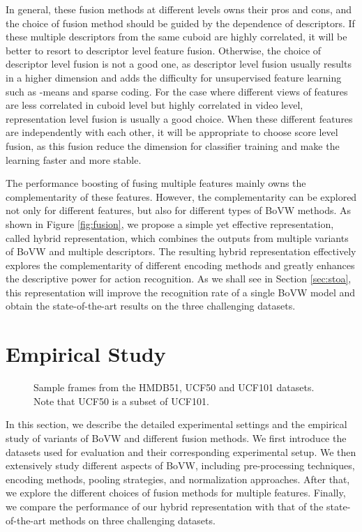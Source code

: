 \documentclass[twocolumn]{svjour3}          \smartqed  \usepackage{slashbox}
\begin{document}
In general, these fusion methods at different levels owns their pros and cons, and the choice of fusion method should be guided by the dependence of descriptors. If these multiple descriptors from the same cuboid are highly correlated, it will be better to resort to descriptor level feature fusion. Otherwise, the choice of descriptor level fusion is not a good one, as descriptor level fusion usually results in a higher dimension and adds the difficulty for unsupervised feature learning such as -means and sparse coding. For the case where different views of features are less correlated in cuboid level but highly correlated in video level, representation level fusion is usually a good choice. When these different features are independently with each other, it will be appropriate to choose score level fusion, as this fusion reduce the dimension for classifier training and make the learning faster and more stable.

The performance boosting of fusing multiple features mainly owns the complementarity of these features. However, the complementarity can be explored not only for different features, but also for different types of BoVW methods. As shown in Figure \ref{fig:fusion}, we propose a simple yet effective representation, called hybrid representation, which combines the outputs from multiple variants of BoVW and multiple descriptors. The resulting hybrid representation effectively explores the complementarity of different encoding methods and greatly enhances the descriptive power for action recognition. As we shall see in Section \ref{sec:stoa}, this representation will improve the recognition rate of a single BoVW model and obtain the state-of-the-art results on the three challenging datasets.

\section{Empirical Study}
\begin{figure*}[!htb]
  \centering
    \caption{Sample frames from the HMDB51, UCF50 and UCF101 datasets. Note that UCF50 is a subset of UCF101.}
  \label{fig:dataset}
\end{figure*}

\label{sec:experiment}
In this section, we describe the detailed experimental settings and the empirical study of variants of BoVW and different fusion methods. We first introduce the datasets used for evaluation and their corresponding experimental setup. We then extensively study different aspects of BoVW, including pre-processing techniques, encoding methods, pooling strategies, and normalization approaches. After that, we explore the different choices of fusion methods for multiple features. Finally, we compare the performance of our hybrid representation with that of the state-of-the-art methods on three challenging datasets.
\end{document}

